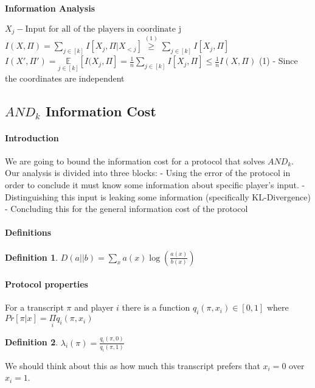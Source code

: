\documentclass{article}
\theoremstyle{plain}
\newtheorem{definition}{Definition}
\begin{document}
\paragraph{Information Analysis}
$X_j - \text{Input for all of the players in coordinate j}$ \newline
$I(X, \Pi) = \underset{j\in[k]}{\sum} I[X_j, \Pi | X_{<j}] \overset{(1)}{\geq } \underset{j\in[k]}{\sum} I[X_j, \Pi]$ \newline
$I(X', \Pi ') = \underset{j \in [k]}{\mathbb{E}}[I(X_j, \Pi] = \frac{1}{n}\underset{j\in[k]}{\sum} I[X_j, \Pi] \leq \frac{1}{n}I(X, \Pi)$ \newline
(1) - Since the coordinates are independent

\subsection{$AND_k$ Information Cost}
\paragraph{Introduction}
We are going to bound the information cost for a protocol that solves $AND_k$. Our analysis is divided into three blocks:  - Using the error of the protocol in order to conclude it must know some information about specific player's input.  - Distinguishing this input is leaking some information (specifically KL-Divergence)  - Concluding this for the general information cost of the protocol \newline
\paragraph{Definitions}
\begin{definition}
$D(a || b) = \underset{x}{\sum}a(x)\log(\frac{a(x)}{b(x)})$
\end{definition}
\paragraph{Protocol properties}
For a transcript $\pi$ and player $i$ there is a function $q_i(\pi, x_i) \in [0,1]$ where \newline
$Pr[\pi | x] = \underset{i}{\Pi}q_i(\pi, x_i )$
\begin{definition}
$\lambda _i (\pi) = \frac{q_i(\pi, 0)}{q_i(\pi, 1)}$
\end{definition}
We should think about this as how much this transcript prefers that $x_i = 0$ over $x_i = 1$.
\end{document}
